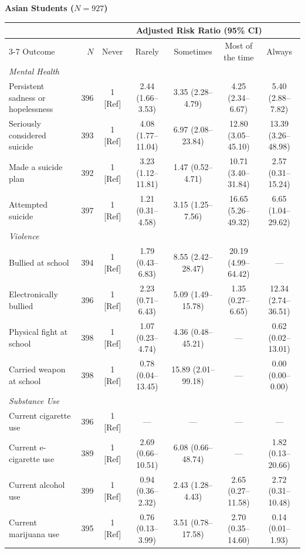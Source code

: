 \documentclass[12pt]{article}
\begin{document}
\begin{landscape}
\nobreak\noindent\textbf{Asian Students ($N = 927$)}
\nopagebreak\par\nopagebreak\vspace{1pt}\nopagebreak
\nobreak\noindent\begin{tabular}{l r ccccc}
\toprule
 & & \multicolumn{5}{c}{Adjusted Risk Ratio (95\% CI)} \\
\cmidrule(lr){3-7}
Outcome & $N$ & Never & Rarely & Sometimes & Most of the time & Always \\
\midrule
\textit{Mental Health} \\
\quad Persistent sadness or hopelessness & 396 & 1 [Ref] & 2.44 (1.66--3.53) & 3.35 (2.28--4.79) & 4.25 (2.34--6.67) & 5.40 (2.88--7.82) \\
\quad Seriously considered suicide & 393 & 1 [Ref] & 4.08 (1.77--11.04) & 6.97 (2.08--23.84) & 12.80 (3.05--45.10) & 13.39 (3.26--48.98) \\
\quad Made a suicide plan & 392 & 1 [Ref] & 3.23 (1.12--11.81) & 1.47 (0.52--4.71) & 10.71 (3.40--31.84) & 2.57 (0.31--15.24) \\
\quad Attempted suicide & 397 & 1 [Ref] & 1.21 (0.31--4.58) & 3.15 (1.25--7.56) & 16.65 (5.26--49.32) & 6.65 (1.04--29.62) \\
\addlinespace[4pt]
\textit{Violence} \\
\quad Bullied at school & 394 & 1 [Ref] & 1.79 (0.43--6.83) & 8.55 (2.42--28.47) & 20.19 (4.99--64.42) & --- \\
\quad Electronically bullied & 396 & 1 [Ref] & 2.23 (0.71--6.43) & 5.09 (1.49--15.78) & 1.35 (0.27--6.65) & 12.34 (2.74--36.51) \\
\quad Physical fight at school & 398 & 1 [Ref] & 1.07 (0.23--4.74) & 4.36 (0.48--45.21) & --- & 0.62 (0.02--13.01) \\
\quad Carried weapon at school & 398 & 1 [Ref] & 0.78 (0.04--13.45) & 15.89 (2.01--99.18) & --- & 0.00 (0.00--0.00) \\
\addlinespace[4pt]
\textit{Substance Use} \\
\quad Current cigarette use & 396 & 1 [Ref] & --- & --- & --- & --- \\
\quad Current e-cigarette use & 389 & 1 [Ref] & 2.69 (0.66--10.51) & 6.08 (0.66--48.74) & --- & 1.82 (0.13--20.66) \\
\quad Current alcohol use & 399 & 1 [Ref] & 0.94 (0.36--2.32) & 2.43 (1.28--4.43) & 2.65 (0.27--11.58) & 2.72 (0.31--10.48) \\
\quad Current marijuana use & 395 & 1 [Ref] & 0.76 (0.13--3.99) & 3.51 (0.78--17.58) & 2.70 (0.35--14.60) & 0.14 (0.01--1.93) \\
\bottomrule
\end{tabular}\par\vspace{8pt}


\end{landscape}
\end{document}
